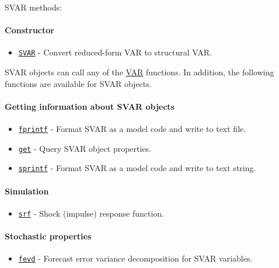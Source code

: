 

	SVAR methods:
 
 \paragraph{Constructor}
 
 \begin{itemize}
 \item
   \href{SVAR/SVAR}{\texttt{SVAR}} - Convert reduced-form VAR to
   structural VAR.
 \end{itemize}
 
 SVAR objects can call any of the \href{VAR/Contents}{VAR} functions. In
 addition, the following functions are available for SVAR objects.
 
 \paragraph{Getting information about SVAR objects}
 
 \begin{itemize}
 \item
   \href{SVAR/fprintf}{\texttt{fprintf}} - Format SVAR as a model code
   and write to text file.
 \item
   \href{SVAR/get}{\texttt{get}} - Query SVAR object properties.
 \item
   \href{SVAR/sprintf}{\texttt{sprintf}} - Format SVAR as a model code
   and write to text string.
 \end{itemize}
 
 \paragraph{Simulation}
 
 \begin{itemize}
 \item
   \href{SVAR/srf}{\texttt{srf}} - Shock (impulse) response function.
 \end{itemize}
 
 \paragraph{Stochastic properties}
 
 \begin{itemize}
 \item
   \href{SVAR/fevd}{\texttt{fevd}} - Forecast error variance
   decomposition for SVAR variables.
 \end{itemize}
 
